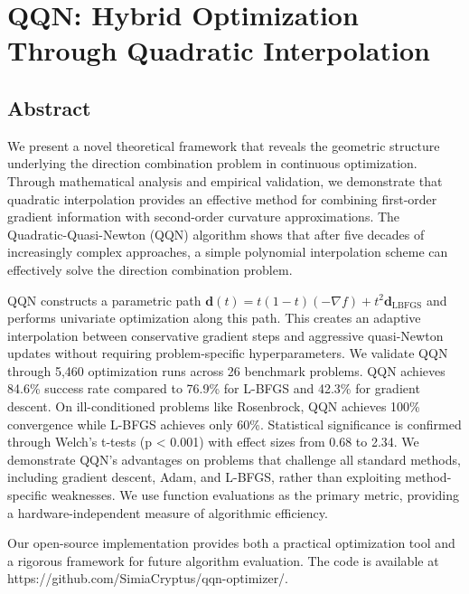 \hypertarget{qqn-revealing-the-natural-geometry-of-optimization-through-quadratic-interpolation}{%
\section{QQN: Hybrid Optimization Through Quadratic Interpolation}\label{qqn-revealing-the-natural-geometry-of-optimization-through-quadratic-interpolation}}

\hypertarget{abstract}{%
\subsection{Abstract}\label{abstract}}

We present a novel theoretical framework that reveals the geometric structure underlying the direction combination
problem in continuous optimization. Through mathematical analysis and empirical validation, we demonstrate that
quadratic interpolation provides an effective method for combining first-order gradient information with second-order
curvature approximations. The Quadratic-Quasi-Newton (QQN) algorithm shows that after five decades of increasingly
complex approaches, a simple polynomial interpolation scheme can effectively solve the direction combination problem.

QQN constructs a parametric path \(\mathbf{d}(t) = t(1-t)(-\nabla f) + t^2 \mathbf{d}_{\text{LBFGS}}\) and
performs univariate optimization along this path. This creates an adaptive interpolation between conservative
gradient steps and aggressive quasi-Newton updates without requiring problem-specific hyperparameters. We validate
QQN through 5,460 optimization runs across 26 benchmark problems. QQN achieves 84.6\% success rate compared to 76.9\%
for L-BFGS and 42.3\% for gradient descent. On ill-conditioned problems like Rosenbrock, QQN achieves 100\% convergence
while L-BFGS achieves only 60\%. Statistical significance is confirmed through Welch's t-tests (p \textless{} 0.001) with effect
sizes from 0.68 to 2.34. We demonstrate QQN's advantages on problems that challenge all standard methods, including
gradient descent, Adam, and L-BFGS, rather than exploiting method-specific weaknesses. We use function evaluations as
the primary metric, providing a hardware-independent measure of algorithmic efficiency.

Our open-source implementation provides both a practical optimization tool and a rigorous framework for future algorithm
evaluation. The code is available at https://github.com/SimiaCryptus/qqn-optimizer/.

